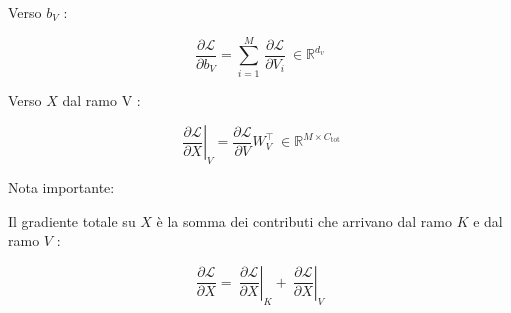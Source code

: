 \documentclass[
  11pt,
]{article}
\begin{document}
Verso \(b_{V}\) :

\[\frac{\partial\mathcal{L}}{\partial b_{V}} = \sum_{i = 1}^{M}\,\frac{\partial\mathcal{L}}{\partial V_{i}}\  \in \mathbb{R}^{d_{v}}\]

Verso \(X\) dal ramo V :

\[\left. \ \frac{\partial\mathcal{L}}{\partial X} \right|_{V} = \frac{\partial\mathcal{L}}{\partial V}W_{V}^{\top}\  \in \mathbb{R}^{M \times C_{\text{tot}}}\]

Nota importante:

Il gradiente totale su \(X\) è la somma dei contributi che arrivano dal
ramo \(K\) e dal ramo \(V\) :

\[\frac{\partial\mathcal{L}}{\partial X} = \left. \ \frac{\partial\mathcal{L}}{\partial X} \right|_{K} + \left. \ \frac{\partial\mathcal{L}}{\partial X} \right|_{V}\]
\end{document}
